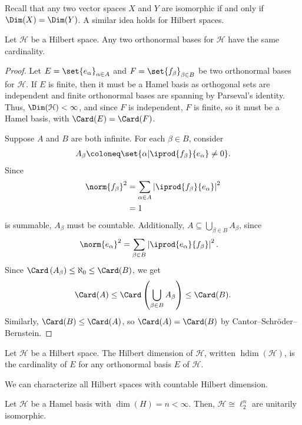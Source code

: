 \documentclass[10pt]{mypackage}
\DeclareMathOperator{\hdim}{hdim}
\begin{document}
Recall that any two vector spaces $X$ and $Y$ are isomorphic if and only if $\Dim(X) = \Dim(Y)$. A similar idea holds for Hilbert spaces.
\begin{proposition}
Let $\mathcal{H}$ be a Hilbert space. Any two orthonormal bases for $\mathcal{H}$ have the same cardinality.
\end{proposition}
\begin{proof}
  Let $E = \set{e_{\alpha}}_{\alpha \in A}$ and $F = \set{f_{\beta}}_{\beta \in B}$ be two orthonormal bases for $\mathcal{H}$. If $E$ is finite, then it must be a Hamel basis as orthogonal sets are independent and finite orthonormal bases are spanning by Parseval's identity. Thus, $\Dim(\mathcal{H}) < \infty$, and since $F$ is independent, $F$ is finite, so it must be a Hamel basis, with $\Card(E) = \Card(F)$.\newline

  Suppose $A$ and $B$ are both infinite. For each $\beta \in B$, consider
  \begin{align*}
    A_{\beta} \coloneq \set{\alpha | \iprod{f_{\beta}}{e_{\alpha}} \neq 0}.
  \end{align*}
  Since
  \begin{align*}
    \norm{f_{\beta}}^2 &= \sum_{\alpha \in A} \left\vert \iprod{f_{\beta}}{e_{\alpha}} \right\vert^2\\
                       &= 1
  \end{align*}
  is summable, $A_{\beta}$ must be countable. Additionally, $A\subseteq \bigcup_{\beta \in B}A_{\beta}$, since
  \begin{align*}
    \norm{e_{\alpha}}^2 &= \sum_{\beta \in B}\left\vert \iprod{e_{\alpha}}{f_{\beta}} \right\vert^2.
  \end{align*}
  Since $\Card\left(A_{\beta}\right) \leq \aleph_0\leq \Card(B)$, we get
  \begin{align*}
    \Card(A) \leq \Card\left(\bigcup_{\beta \in B}A_{\beta}\right)\leq \Card(B).
  \end{align*}
  Similarly, $\Card(B) \leq \Card(A)$, so $\Card(A) = \Card(B)$ by Cantor--Schröder--Bernstein.
\end{proof}
\begin{definition}
  Let $\mathcal{H}$ be a Hilbert space. The Hilbert dimension of $\mathcal{H}$, written $\hdim(\mathcal{H})$, is the cardinality of $E$ for any orthonormal basis $E$ of $\mathcal{H}$.
\end{definition}
We can characterize all Hilbert spaces with countable Hilbert dimension.
\begin{proposition}
  Let $\mathcal{H}$ be a Hamel basis with $\dim(H) = n < \infty$. Then, $\mathcal{H} \cong \ell_2^{n}$ are unitarily isomorphic.
\end{proposition}
\end{document}
